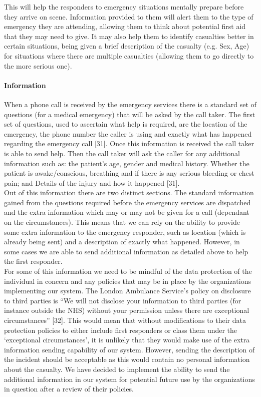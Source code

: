 \documentclass{article}
\begin{document}
This will help the responders to emergency situations mentally prepare before they arrive on scene. Information provided to them will alert them to the type of emergency they are attending, allowing them to think about potential first aid that they may need to give. It may also help them to identify casualties better in certain situations, being given a brief description of the casualty (e.g. Sex, Age) for situations where there are multiple casualties (allowing them to go directly to the more serious one).

\paragraph{Information}
When a phone call is received by the emergency services there is a standard set of questions (for a medical emergency) that will be asked by the call taker. The first set of questions, used to ascertain what help is required, are the location of the emergency, the phone number the caller is using and exactly what has happened regarding the emergency call [31]. Once this information is received the call taker is able to send help. Then the call taker will ask the caller for any additional information such as: the patient's age, gender and medical history. Whether the patient is awake/conscious, breathing and if there is any serious bleeding or chest pain; and Details of the injury and how it happened [31].\\

Out of this information there are two distinct sections. The standard information gained from the questions required before the emergency services are dispatched and the extra information which may or may not be given for a call (dependant on the circumstances). This means that we can rely on the ability to provide some extra information to the emergency responder, such as location (which is already being sent) and a description of exactly what happened. However, in some cases we are able to send additional information as detailed above to help the first responder.\\

For some of this information we need to be mindful of the data protection of the individual in concern and any policies that may be in place by the organizations implementing our system. The London Ambulance Service’s policy on disclosure to third parties is “We will not disclose your information to third parties (for instance outside the NHS) without your permission unless there are exceptional circumstances” [32]. This would mean that without modifications to their data protection policies to either include first responders or class them under the ‘exceptional circumstances’, it is unlikely that they would make use of the extra information sending capability of our system. However, sending the description of the incident should be acceptable as this would contain no personal information about the casualty. We have decided to implement the ability to send the additional information in our system for potential future use by the organizations in question after a review of their policies.\\
\end{document}
